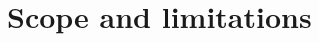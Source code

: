 \label{sec:1_3_scope_and_limitations}

\begin{comment}
Here you can tell the reader about the scope of your thesis, kind of meaning describing what you have done in slighter more detail. The question in section 1.2 might be of the general type, but are you using any specific case studies/application scenarios? Are you limited to a specific type of platform? Have you performed experiments in special environments only, etc.? Describe such information here so that the reader does not expect something going beyond this.
\end{comment}

\section{Scope and limitations}









    
    
    
    


    
